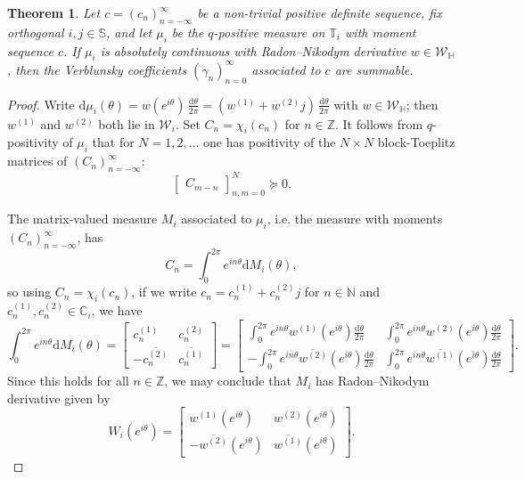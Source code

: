 \documentclass[11pt,reqno]{amsart}
\def\x{\chi}
\def\g{\gamma}
\def\th{\theta}
\def\rmd{\mathrm{d}}
\def\NN{\mathbb{N}}
\def\ZZ{\mathbb{Z}}
\def\CC{\mathbb{C}}
\def\SS{\mathbb{S}}
\def\TT{\mathbb{T}}
\def\HH{\mathbb{H}}
\newtheorem{theorem}{Theorem}[section]
\theoremstyle{definition}
\numberwithin{equation}{section}
\begin{document}
\begin{theorem}
    Let \(c = (c_n)_{n=-\infty}^{\infty}\) be a non-trivial positive definite sequence, fix orthogonal \(i,j\in\SS\), and let \(\mu_i\) be the \(q\)-positive measure on \(\TT_i\) with moment sequence \(c\). If \(\mu_i\) is absolutely continuous with Radon--Nikodym derivative \(w \in \mathscr{W}_\HH\), then the Verblunsky coefficients \((\g_n)_{n=0}^{\infty}\) associated to \(c\) are summable.
\end{theorem}

\begin{proof}
    Write \(\rmd\mu_i(\th) = w(e^{i\th}) \, \frac{\rmd\th}{2\pi} = (w^{(1)} + w^{(2)} j ) \, \frac{\rmd\th}{2\pi}\) with \(w \in \mathscr{W}_{\HH}\); then \(w^{(1)}\) and \(w^{(2)}\) both lie in \(\mathscr{W}_{i}\). Set \(C_n = \x_i(c_n)\) for \(n \in \ZZ\). It follows from \(q\)-positivity of \(\mu_i\) that for \(N = 1, 2, \ldots\) one has positivity of the \(N \times N\) block-Toeplitz matrices of \((C_n)_{n=-\infty}^{\infty}\):
    \[
        \begin{bmatrix} C_{m-n} \end{bmatrix}_{n,m=0}^{N} \succeq 0.
    \]
    
    The matrix-valued measure \(M_i\) associated to \(\mu_i\), i.e. the measure with moments \((C_n)_{n=-\infty}^{\infty}\), has
    \[
        C_n = \int_0^{2\pi} e^{in\th} \rmd M_i(\th),
    \]
    so using \(C_n = \x_i(c_n)\), if we write \(c_n = c_n^{(1)} + c_n^{(2)}j\) for \(n \in \NN\) and \(c_n^{(1)}, c_n^{(2)} \in \CC_i\), we have
    \[
        \int_0^{2\pi} e^{in\th} \rmd M_i(\th) = \begin{bmatrix} c_n^{(1)} & c_n^{(2)} \\[6pt] -\overline{c_n^{(2)}} & \overline{c_n^{(1)}} \end{bmatrix} = \begin{bmatrix} \int_0^{2\pi} e^{in\th} w^{(1)}(e^{i\th}) \frac{\rmd\th}{2\pi} & \int_0^{2\pi} e^{in\th}w^{(2)}(e^{i\th})\frac{\rmd\th}{2\pi} \\[6pt] - \int_0^{2\pi} e^{in\th} \overline{w^{(2)}}(e^{i\th})\frac{\rmd\th}{2\pi} & \int_0^{2\pi} e^{in\th}\overline{w^{(1)}}(e^{i\th}) \frac{\rmd\th}{2\pi}\end{bmatrix}. 
    \]
    Since this holds for all \(n\in\ZZ\), we may conclude that \(M_i\) has Radon--Nikodym derivative given by
    \[
        W_i(e^{i\th}) = \begin{bmatrix} w^{(1)}(e^{i\th}) & w^{(2)}(e^{i\th}) \\[6pt] -\overline{w^{(2)}}(e^{i\th}) & \overline{w^{(1)}}(e^{i\th}) \end{bmatrix}.
    \]
    

\end{proof}
\end{document}
